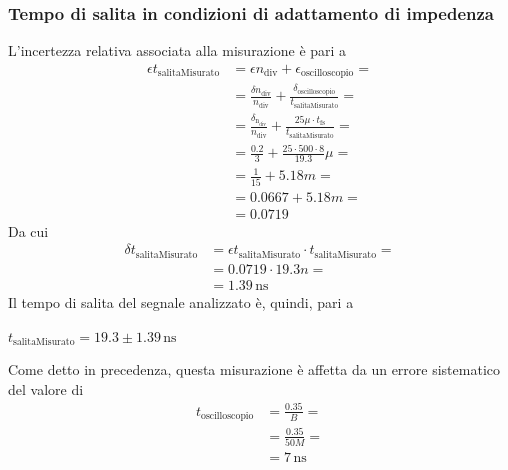 \documentclass[a4paper]{article}
\begin{document}
			\subsubsection{Tempo di salita in condizioni di adattamento di impedenza}
				L'incertezza relativa associata alla misurazione è pari a 
				\begin{equation*}
					\begin{split}
						\epsilon t_{\mathrm{salitaMisurato}} &= \epsilon n_{\mathrm{div}} + \epsilon_{\mathrm{oscilloscopio}} = \\
														 	 &= \frac{\delta n_{\mathrm{div}}}{n_{\mathrm{div}}} + \frac{\delta_{\mathrm{oscilloscopio}}}{t_{\mathrm{salitaMisurato}}} = \\
														 	 &= \frac{\delta_{\mathrm{n_{\mathrm{div}}}}}{n_{\mathrm{div}}} + \frac{25\mu \cdot t_{\mathrm{fs}}}{t_{\mathrm{salitaMisurato}}} = \\
														 	 &= \frac{0.2}{3} + \frac{25 \cdot 500 \cdot 8}{19.3}\mu = \\
														 	 &= \frac{1}{15} + 5.18m = \\
														 	 &= 0.0667 + 5.18m = \\
														 	 &= 0.0719
					\end{split}
				\end{equation*}
				Da cui
				\begin{equation*}
					\begin{split}
						\delta t_{\mathrm{salitaMisurato}} &= \epsilon t_{\mathrm{salitaMisurato}} \cdot t_{\mathrm{salitaMisurato}} = \\
														   &= 0.0719 \cdot 19.3n = \\
														   &= 1.39 \, \mathrm{ns}
					\end{split}
				\end{equation*}
				Il tempo di salita del segnale analizzato è, quindi, pari a
				\newline
				\begin{center}
					$ t_{\mathrm{salitaMisurato}} = 19.3 \pm 1.39 \, \mathrm{ns} $
				\end{center}
				\newline
				Come detto in precedenza, questa misurazione è affetta da un errore sistematico del valore di
				\begin{equation*}
					\begin{split}
						t_{\mathrm{oscilloscopio}} &= \frac{0.35}{B} = \\
												   &= \frac{0.35}{50M} = \\
												   &= 7 \, \mathrm{ns}
					\end{split}
				\end{equation*}
\end{document}
